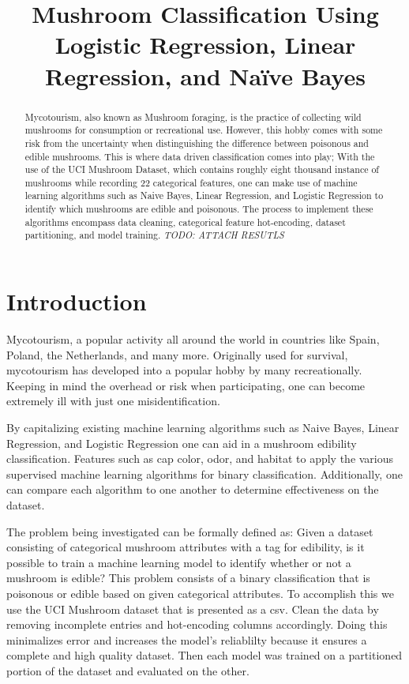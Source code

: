 \documentclass[conference]{IEEEtran}
\begin{document}
\title{Mushroom Classification Using Logistic Regression, Linear Regression, and Naïve Bayes}

\author{
}

\maketitle

\begin{abstract}
    Mycotourism, also known as Mushroom foraging, is the practice of collecting wild mushrooms for consumption or recreational use. However, this hobby comes with some risk from the uncertainty when distinguishing the difference between poisonous and edible mushrooms. This is where data driven classification comes into play; With the use of the UCI Mushroom Dataset, which contains roughly eight thousand instance of mushrooms while recording 22 categorical features, one can make use of machine learning algorithms such as Naive Bayes, Linear Regression, and Logistic Regression to identify which mushrooms are edible and poisonous. The process to implement these algorithms encompass data cleaning, categorical feature hot-encoding, dataset partitioning, and model training. \emph{TODO: ATTACH RESUTLS} 
\end{abstract}

\section{Introduction}
    Mycotourism, a popular activity all around the world in countries like Spain, Poland, the Netherlands, and many more. Originally used for survival, mycotourism has developed into a popular hobby by many recreationally. Keeping in mind the overhead or risk when participating, one can become extremely ill with just one misidentification. 

    By capitalizing existing machine learning algorithms such as Naive Bayes, Linear Regression, and Logistic Regression one can aid in a mushroom edibility classification. Features such as cap color, odor, and habitat to apply the various supervised machine learning algorithms for binary classification. Additionally, one can compare each algorithm to one another to determine effectiveness on the dataset. 

    The problem being investigated can be formally defined as: Given a dataset consisting of categorical mushroom attributes with a tag for edibility, is it possible to train a machine learning model to identify whether or not a mushroom is edible? This problem consists of a binary classification that is poisonous or edible based on given categorical attributes. To accomplish this we use the UCI Mushroom dataset that is presented as a csv. Clean the data by removing incomplete entries and hot-encoding columns accordingly. Doing this minimalizes error and increases the model's reliablilty because it ensures a complete and high quality dataset. Then each model was trained on a partitioned portion of the dataset and evaluated on the other.
\end{document}
